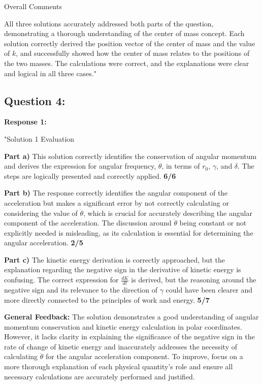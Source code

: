 \documentclass[a4paper,11pt]{article}
\begin{document}
Overall Comments

All three solutions accurately addressed both parts of the question, demonstrating a thorough understanding of the center of mass concept. Each solution correctly derived the position vector of the center of mass and the value of \( k \), and successfully showed how the center of mass relates to the positions of the two masses. The calculations were correct, and the explanations were clear and logical in all three cases."

\subsection*{Question 4:}

\textbf{Response 1:}

"Solution 1 Evaluation

\textbf{Part a)} This solution correctly identifies the conservation of angular momentum and derives the expression for angular frequency, \( \dot{\theta} \), in terms of \( r_0 \), \( \gamma \), and \( \delta \). The steps are logically presented and correctly applied. \textbf{6/6}

\textbf{Part b)} The response correctly identifies the angular component of the acceleration but makes a significant error by not correctly calculating or considering the value of \( \ddot{\theta} \), which is crucial for accurately describing the angular component of the acceleration. The discussion around \( \ddot{\theta} \) being constant or not explicitly needed is misleading, as its calculation is essential for determining the angular acceleration. \textbf{2/5}

\textbf{Part c)} The kinetic energy derivation is correctly approached, but the explanation regarding the negative sign in the derivative of kinetic energy is confusing. The correct expression for \( \frac{dK}{dt} \) is derived, but the reasoning around the negative sign and its relevance to the direction of \(\gamma\) could have been clearer and more directly connected to the principles of work and energy. \textbf{5/7}

\textbf{General Feedback:} The solution demonstrates a good understanding of angular momentum conservation and kinetic energy calculation in polar coordinates. However, it lacks clarity in explaining the significance of the negative sign in the rate of change of kinetic energy and inaccurately addresses the necessity of calculating \( \ddot{\theta} \) for the angular acceleration component. To improve, focus on a more thorough explanation of each physical quantity's role and ensure all necessary calculations are accurately performed and justified.
\end{document}
